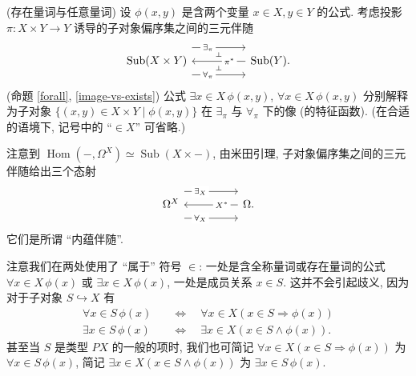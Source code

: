 \begin{example}
	{(存在量词与任意量词)}
	设 $\phi(x,y)$ 是含两个变量 $x\in X,y\in Y$ 的公式.
		考虑投影 $\pi\colon X\times Y\to Y$ 诱导的子对象偏序集之间的三元伴随
		\[\begin{tikzcd}[ampersand replacement=\&,background color=\propcolor]
			{\operatorname{Sub}(X\times Y)} \&\& {\operatorname{Sub}(Y).}
			\arrow[""{name=0, anchor=center, inner sep=0}, "{\pi^*}"{description, pos=0.3}, from=1-3, to=1-1]
			\arrow[""{name=1, anchor=center, inner sep=0}, "{\exists_\pi}"{description, pos=0.3}, shift left=5, from=1-1, to=1-3]
			\arrow[""{name=2, anchor=center, inner sep=0}, "{\forall_\pi}"{description, pos=0.3}, shift right=5, from=1-1, to=1-3]
			\arrow["\dashv"{anchor=center, rotate=-90}, draw=none, from=1, to=0]
			\arrow["\dashv"{anchor=center, rotate=-90}, draw=none, from=0, to=2]
		\end{tikzcd}\]
		(命题 \ref{forall}, \ref{image-vs-exists})
		公式 $\exists x\in X\, \phi(x,y)$, $\forall x\in X\, \phi(x,y)$
		分别解释为子对象 $\{(x,y)\in X\times Y \mid \phi(x,y)\}$ 在 $\exists_\pi$ 与 $\forall_\pi$ 下的像 (的特征函数).
		(在合适的语境下, 记号中的 ``$\in X$'' 可省略.)

	注意到 $\operatorname{Hom}(-,\Omega^X) \simeq\operatorname{Sub}(X\times {-})$, 由米田引理, 子对象偏序集之间的三元伴随给出三个态射
	\[\begin{tikzcd}[ampersand replacement=\&,background color=\propcolor]
		{\Omega^X} \&\& {\Omega.}
		\arrow[""{name=0, anchor=center, inner sep=0}, "{X^*}"{description, pos=0.3}, from=1-3, to=1-1]
		\arrow[""{name=1, anchor=center, inner sep=0}, "{\exists_X}"{description, pos=0.3}, shift left=5, from=1-1, to=1-3]
		\arrow[""{name=2, anchor=center, inner sep=0}, "{\forall_X}"{description, pos=0.3}, shift right=5, from=1-1, to=1-3]
	\end{tikzcd}\]
	它们是所谓 ``内蕴伴随''.
\end{example}

\begin{remark}
	{}
	注意我们在两处使用了 ``属于'' 符号 $\in$: 一处是含全称量词或存在量词的公式 $\forall x\in X\,\phi(x)$ 或 $\exists x\in X\,\phi(x)$,
	一处是成员关系 $x\in S$. 这并不会引起歧义, 因为对于子对象 $S\hookrightarrow X$ 有
	\[
	\begin{aligned}
		\forall x\in S\, \phi(x)&\quad \Leftrightarrow\quad
		\forall x\in X (x\in S\Rightarrow \phi(x))\\
		\exists x\in S\, \phi(x)&\quad \Leftrightarrow\quad
		\exists x\in X (x\in S\land \phi(x)).
	\end{aligned}
	\]
	甚至当 $S$ 是类型 $PX$ 的一般的项时, 我们也可简记 $\forall x\in X(x\in S\Rightarrow\phi(x))$ 为 $\forall x\in S\,\phi(x)$, 简记  $\exists x\in X(x\in S\land\phi(x))$ 为 $\exists x\in S\,\phi(x)$.
\end{remark}

